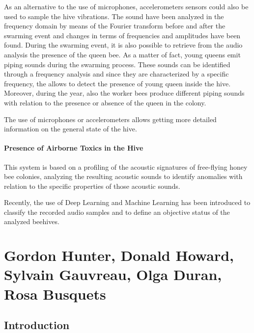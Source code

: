 \documentclass[12pt]{report}
\begin{document}
	\par As an alternative to the use of microphones, accelerometers sensors could also be used to sample the hive vibrations. The sound have been analyzed in the frequency domain by means of the Fourier transform before and after the swarming event and changes in terms of frequencies and amplitudes have been found. During the swarming event, it is also possible to retrieve from the audio analysis the presence of the queen bee. As a matter of fact, young queens emit piping sounds during the swarming process. These sounds can be identified through a frequency analysis and since they are characterized by a specific frequency, the allows to detect the presence of young queen inside the hive. Moreover, during the year, also the worker bees produce different piping sounds with relation to the presence or absence of the queen in the colony.
	
	\par The use of microphones or accelerometers allows getting more detailed information on the general state of the hive.
	
	\subsubsection{Presence of Airborne Toxics in the Hive}
	
	This system is based on a profiling of the acoustic signatures of free-flying honey bee colonies, analyzing the resulting acoustic sounds to identify anomalies with relation to the specific properties of those acoustic sounds.
	
	\par Recently, the use of Deep Learning and Machine Learning has been introduced to classify the recorded audio samples and to define an objective status of the analyzed beehives.
	
	
	\chapter{Gordon Hunter, Donald Howard, Sylvain Gauvreau, Olga Duran, Rosa Busquets}
	
	\section{Introduction}
	
\end{document}
